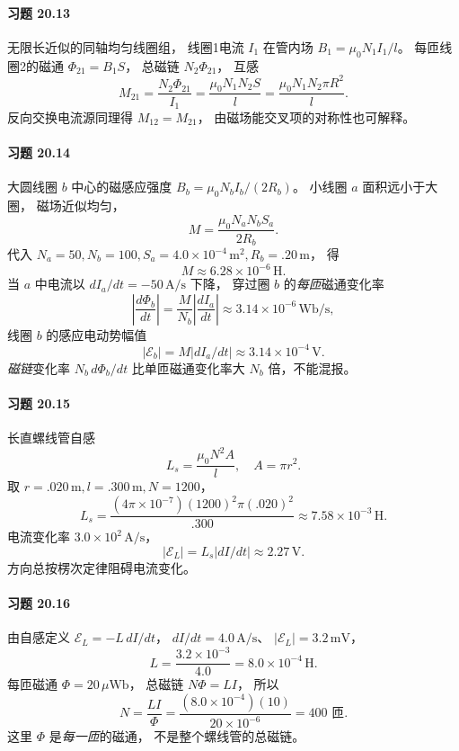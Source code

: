 \paragraph{习题 20.13}
无限长近似的同轴均匀线圈组，
线圈1电流 \(I_1\) 在管内场
\(B_1=\mu_0N_1I_1/l\)。
每匝线圈2的磁通
\(\Phi_{21}=B_1S\)，
总磁链 \(N_2\Phi_{21}\)，
互感
\[
 \boxed{M_{21}=\frac{N_2\Phi_{21}}{I_1}
 =\frac{\mu_0N_1N_2S}{l}
 =\frac{\mu_0N_1N_2\pi R^2}{l}}.
\]
反向交换电流源同理得
\(\boxed{M_{12}=M_{21}}\)，
由磁场能交叉项的对称性也可解释。

\paragraph{习题 20.14}
大圆线圈 \(b\) 中心的磁感应强度
\(B_b=\mu_0N_bI_b/(2R_b)\)。
小线圈 \(a\) 面积远小于大圈，
磁场近似均匀，
\[
 \boxed{M=\frac{\mu_0N_aN_bS_a}{2R_b}}.
\]
代入
\(N_a=50,N_b=100,
S_a=4.0\times10^{-4}\,\mathrm{m^2},R_b=.20\,\mathrm m\)，
得
\[
 \boxed{M\approx6.28\times10^{-6}\,\mathrm H}.
\]
当 \(a\) 中电流以
\(dI_a/dt=-50\,\mathrm{A/s}\) 下降，
穿过圈 \(b\) 的\emph{每匝}磁通变化率
\[
 \boxed{\left|\frac{d\Phi_b}{dt}\right|
 =\frac{M}{N_b}\left|\frac{dI_a}{dt}\right|
 \approx3.14\times10^{-6}\,\mathrm{Wb/s}},
\]
线圈 \(b\) 的感应电动势幅值
\[
 \boxed{|\mathcal E_b|=M|dI_a/dt|
 \approx3.14\times10^{-4}\,\mathrm V}.
\]
\emph{磁链}变化率 \(N_b\,d\Phi_b/dt\)
比单匝磁通变化率大 \(N_b\) 倍，不能混报。

\paragraph{习题 20.15}
长直螺线管自感
\[
 L_s=\frac{\mu_0N^2A}{l},
\quad A=\pi r^2.
\]
取 \(r=.020\,\mathrm m,l=.300\,\mathrm m,N=1200\)，
\[
 \boxed{L_s=
 \frac{(4\pi\times10^{-7})(1200)^2\pi(.020)^2}{.300}
 \approx7.58\times10^{-3}\,\mathrm H}.
\]
电流变化率
\(3.0\times10^2\,\mathrm{A/s}\)，
\[
 \boxed{|\mathcal E_L|=L_s|dI/dt|
 \approx2.27\,\mathrm V}.
\]
方向总按楞次定律阻碍电流变化。


\paragraph{习题 20.16}
由自感定义
\(\mathcal E_L=-L\,dI/dt\)，
\(dI/dt=4.0\,\mathrm{A/s}\)、
\(|\mathcal E_L|=3.2\,\mathrm{mV}\)，
\[
 \boxed{L=\frac{3.2\times10^{-3}}{4.0}
 =8.0\times10^{-4}\,\mathrm H}.
\]
每匝磁通
\(\Phi=20\,\mu\mathrm{Wb}\)，
总磁链 \(N\Phi=LI\)，
所以
\[
 \boxed{N=\frac{LI}{\Phi}
 =\frac{(8.0\times10^{-4})(10)}
 {20\times10^{-6}}=400\text{ 匝}}.
\]
这里 \(\Phi\) 是\emph{每一匝}的磁通，
不是整个螺线管的总磁链。

